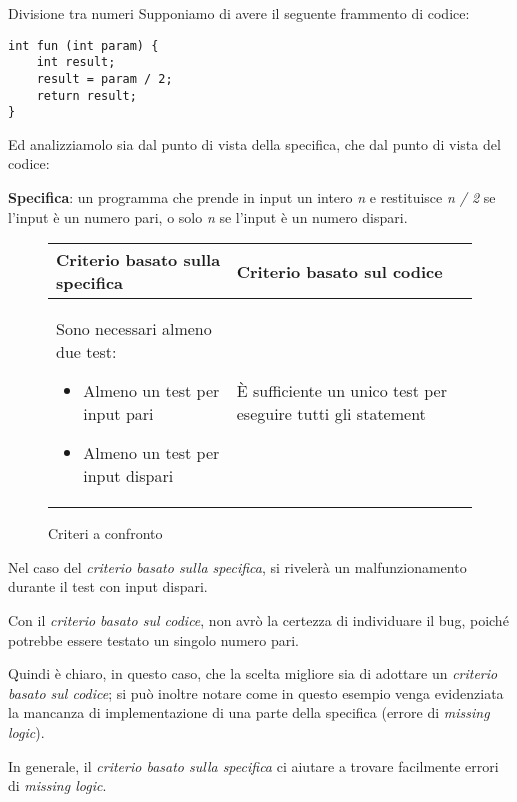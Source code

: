 \begin{example}{}{Divisione tra numeri}
    Supponiamo di avere il seguente frammento di codice:

    \begin{lstlisting}
int fun (int param) {
    int result;
    result = param / 2;
    return result;
}
    \end{lstlisting}
    Ed analizziamolo sia dal punto di vista della specifica, che dal punto di vista del codice:

    \textbf{Specifica}: un programma che prende in input un intero \textit{n} e restituisce \textit{n / 2} se l'input è un numero pari, o solo \textit{n} se l'input è un numero dispari.

    \begin{figure}[H]
    \caption{Criteri a confronto}
    \begin{center}
    \begin{tabular}{p{5cm} | p{5cm}}
        Criterio basato sulla specifica & Criterio basato sul codice \\ \hline
        Sono necessari almeno due test: \begin{itemize}
            \item Almeno un test per input pari
            \item Almeno un test per input dispari
        \end{itemize}
        & È sufficiente un unico test per eseguire tutti gli statement
    \end{tabular}
    \end{center}
    \end{figure}

    Nel caso del \textit{criterio basato sulla specifica}, si rivelerà un malfunzionamento durante il test con input dispari.

    Con il \textit{criterio basato sul codice}, non avrò la certezza di individuare il bug, poiché potrebbe essere testato un singolo numero pari.

    Quindi è chiaro, in questo caso, che la scelta migliore sia di adottare un \textit{criterio basato sul codice}; si può inoltre notare come in questo esempio venga evidenziata la mancanza di implementazione di una parte della specifica (errore di \textit{missing logic}).

    In generale, il \textit{criterio basato sulla specifica} ci aiutare a trovare facilmente errori di \textit{missing logic}.
\end{example}

